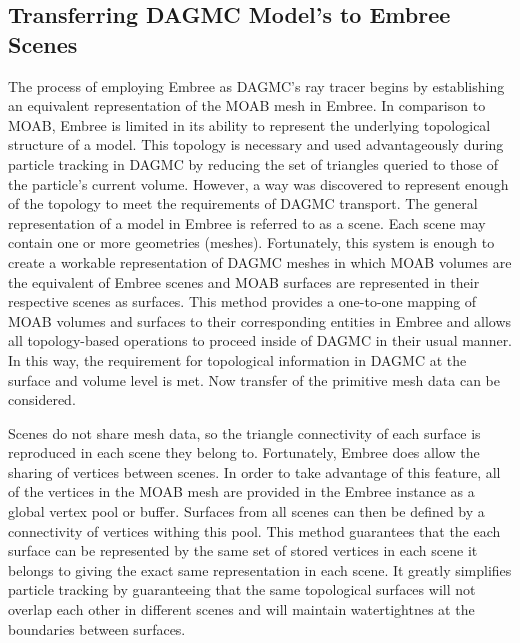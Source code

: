 \documentclass[10pt, a4paper]{article}
\begin{document}
\subsection{Transferring DAGMC Model's to Embree Scenes}%

The process of employing Embree as DAGMC's ray tracer begins by establishing an equivalent representation of the MOAB mesh in Embree. In comparison to MOAB, Embree is limited in its ability to represent the underlying topological structure of a model. This topology is necessary and used advantageously during particle tracking in DAGMC by reducing the set of triangles queried to those of the particle's current volume. However, a way was discovered to represent enough of the topology to meet the requirements of DAGMC transport. The general representation of a model in Embree is referred to as a scene. Each scene may contain one or more geometries (meshes). Fortunately, this system is enough to create a workable representation of DAGMC meshes in which MOAB volumes are the equivalent of Embree scenes and MOAB surfaces are represented in their respective scenes as surfaces. This method provides a one-to-one mapping of MOAB volumes and surfaces to their corresponding entities in Embree and allows all topology-based operations to proceed inside of DAGMC in their usual manner. In this way, the requirement for topological information in DAGMC at the surface and volume level is met. Now transfer of the primitive mesh data can be considered.

Scenes do not share mesh data, so the triangle connectivity of each surface is reproduced in each scene they belong to. Fortunately, Embree does allow the sharing of vertices between scenes. In order to take advantage of this feature, all of the vertices in the MOAB mesh are provided in the Embree instance as a global vertex pool or buffer. Surfaces from all scenes can then be defined by a connectivity of vertices withing this pool. This method guarantees that the each surface can be represented by the same set of stored vertices in each scene it belongs to giving the exact same representation in each scene. It greatly simplifies particle tracking by guaranteeing that the same topological surfaces will not overlap each other in different scenes and will maintain watertightnes at the boundaries between surfaces.
\end{document}
